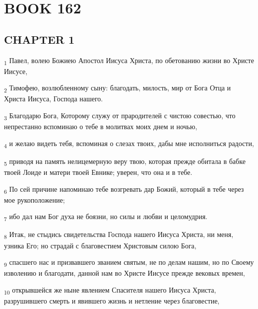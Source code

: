 \section{BOOK 162}
\subsection{CHAPTER 1}
\begin{tcolorbox}
\textsubscript{1} Павел, волею Божиею Апостол Иисуса Христа, по обетованию жизни во Христе Иисусе,
\end{tcolorbox}
\begin{tcolorbox}
\textsubscript{2} Тимофею, возлюбленному сыну: благодать, милость, мир от Бога Отца и Христа Иисуса, Господа нашего.
\end{tcolorbox}
\begin{tcolorbox}
\textsubscript{3} Благодарю Бога, Которому служу от прародителей с чистою совестью, что непрестанно вспоминаю о тебе в молитвах моих днем и ночью,
\end{tcolorbox}
\begin{tcolorbox}
\textsubscript{4} и желаю видеть тебя, вспоминая о слезах твоих, дабы мне исполниться радости,
\end{tcolorbox}
\begin{tcolorbox}
\textsubscript{5} приводя на память нелицемерную веру твою, которая прежде обитала в бабке твоей Лоиде и матери твоей Евнике; уверен, что она и в тебе.
\end{tcolorbox}
\begin{tcolorbox}
\textsubscript{6} По сей причине напоминаю тебе возгревать дар Божий, который в тебе через мое рукоположение;
\end{tcolorbox}
\begin{tcolorbox}
\textsubscript{7} ибо дал нам Бог духа не боязни, но силы и любви и целомудрия.
\end{tcolorbox}
\begin{tcolorbox}
\textsubscript{8} Итак, не стыдись свидетельства Господа нашего Иисуса Христа, ни меня, узника Его; но страдай с благовестием Христовым силою Бога,
\end{tcolorbox}
\begin{tcolorbox}
\textsubscript{9} спасшего нас и призвавшего званием святым, не по делам нашим, но по Своему изволению и благодати, данной нам во Христе Иисусе прежде вековых времен,
\end{tcolorbox}
\begin{tcolorbox}
\textsubscript{10} открывшейся же ныне явлением Спасителя нашего Иисуса Христа, разрушившего смерть и явившего жизнь и нетление через благовестие,
\end{tcolorbox}
